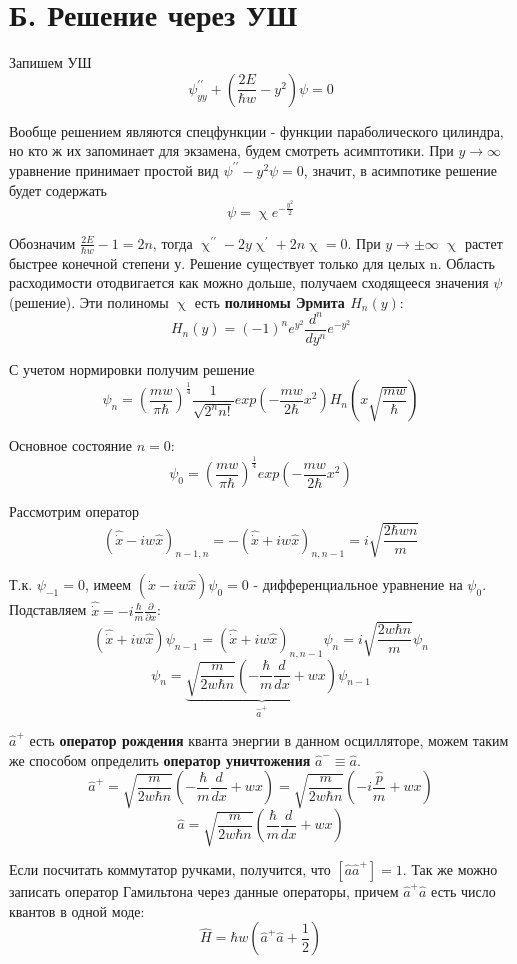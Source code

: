 \section{Б. Решение через УШ}
\par Запишем УШ
$$ \psi^{\prime\prime}_{yy} + \left(\frac{2E}{\hbar w} - y^2 \right) \psi =0$$
\par Вообще решением являются спецфункции - функции параболического цилиндра, но кто ж их запоминает для экзамена, будем смотреть асимптотики. При $y \rightarrow \infty$ уравнение принимает простой вид $ \psi^{\prime\prime} - y^2 \psi =0$, значит, в асимпотике решение будет содержать 
$$\psi = \upchi e^{-\frac{y^2}{2}}$$
\par Обозначим $\frac{2E}{\hbar w} -1 =2n$, тогда $\upchi^{\prime \prime}-2y \upchi^\prime +2n\upchi =0$. При $y \rightarrow \pm \infty $ $\upchi$ растет быстрее конечной степени у. Решение существует только для целых n. Область расходимости отодвигается как можно дольше, получаем сходящееся значения $\psi$(решение). Эти полиномы $\upchi$ есть \textbf{полиномы Эрмита $H_n(y)$}:
$$H_n(y) = (-1)^n e^{y^2} \frac{d^n}{dy^n}e^{-y^2}$$
\par С учетом нормировки получим решение 
$$\psi_n = \left( \frac{mw}{\pi \hbar} \right)^{\frac{1}{4}} \frac{1}{\sqrt{2^n n!}} exp \left(- \frac{mw}{2 \hbar} x^2 \right) H_n \left(x \sqrt{\frac{mw}{\hbar}} \right)$$
\par Основное состояние $n=0$: 
$$\psi_0 = \left( \frac{mw}{\pi \hbar} \right)^{\frac{1}{4}} exp \left(- \frac{mw}{2 \hbar} x^2 \right) $$
\par Рассмотрим оператор
$$\left(\hat{\dot{x}} - iw \hat{x} \right)_{n-1, n} = - \left(\hat{\dot{x}} + iw \hat{x} \right)_{n, n-1} = i \sqrt{\frac{2\hbar w n }{m}}$$
\par Т.к. $\psi_{-1}=0$, имеем $\left(\hat{\dot{x}} - iw \hat{x}\right) \psi_0 = 0 $ - дифференциальное уравнение на $\psi_0$. Подставляем $\hat{\dot{x}} = - i \frac{\hbar}{m} \frac{\partial}{\partial x}$:
$$\left(\hat{\dot{x}} + iw \hat{x}\right) \psi_{n-1} = \left(\hat{\dot{x}} + iw \hat{x}\right)_{n, n-1} \psi_{n}= i \sqrt{\frac{2w\hbar n}{m}} \psi_n $$
$$\psi_n = \underbrace{\sqrt{\frac{m}{2w\hbar n}} \left(-\frac{\hbar}{m}\frac{d}{dx}+wx \right)}_{\hat{a}^+} \psi_{n-1}$$
\par $\hat{a}^+$ есть \textbf{оператор рождения} кванта энергии в данном осцилляторе, можем таким же способом определить \textbf{оператор уничтожения} $\hat{a}^- \equiv \hat{a}$.
$$\hat{a}^+ = \sqrt{\frac{m}{2w\hbar n}} \left(-\frac{\hbar}{m}\frac{d}{dx}+wx \right) = \sqrt{\frac{m}{2w\hbar n}} \left(-i\frac{\hat{p}}{m}+wx \right) $$
$$\hat{a} = \sqrt{\frac{m}{2w\hbar n}} \left(\frac{\hbar}{m}\frac{d}{dx}+wx \right) $$
\par Если посчитать коммутатор ручками, получится, что $[\hat{a} \hat{a}^+]=1$. Так же можно записать оператор Гамильтона через данные операторы, причем $\hat{a}^+\hat{a}$ есть число квантов в одной моде:
$$\hat{H}= \hbar w \left(\hat{a}^+\hat{a} +\frac{1}{2} \right)$$